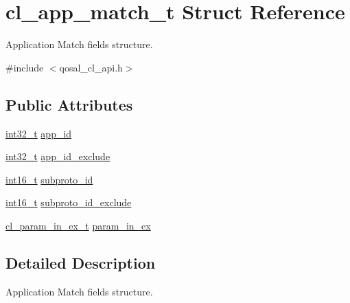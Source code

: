 \hypertarget{structcl__app__match__t}{\section{cl\-\_\-app\-\_\-match\-\_\-t Struct Reference}
\label{structcl__app__match__t}
}


Application Match fields structure.  




{\ttfamily \#include $<$qosal\-\_\-cl\-\_\-api.\-h$>$}

\subsection*{Public Attributes}
\begin{DoxyCompactItemize}
\item 
\hyperlink{commondefs_8h_a32f2e37ee053cf2ce8ca28d1f74630e5}{int32\-\_\-t} \hyperlink{structcl__app__match__t_ab514d0ca0def2e9a568e3007d0fb91c7}{app\-\_\-id}
\item 
\hyperlink{commondefs_8h_a32f2e37ee053cf2ce8ca28d1f74630e5}{int32\-\_\-t} \hyperlink{structcl__app__match__t_a72a78aa05541db433b06bb5128a11ca7}{app\-\_\-id\-\_\-exclude}
\item 
\hyperlink{commondefs_8h_a66634143db08bebe9b46ab4cb1fc6fd3}{int16\-\_\-t} \hyperlink{structcl__app__match__t_a8847ab7f98f9790cae0ff81b77ccae83}{subproto\-\_\-id}
\item 
\hyperlink{commondefs_8h_a66634143db08bebe9b46ab4cb1fc6fd3}{int16\-\_\-t} \hyperlink{structcl__app__match__t_aa808b2fdd35ed55f21630678bdf1e599}{subproto\-\_\-id\-\_\-exclude}
\item 
\hyperlink{structcl__param__in__ex__t}{cl\-\_\-param\-\_\-in\-\_\-ex\-\_\-t} \hyperlink{structcl__app__match__t_a5084baee848246640f5affd79c04da3e}{param\-\_\-in\-\_\-ex}
\end{DoxyCompactItemize}


\subsection{Detailed Description}
Application Match fields structure. 

